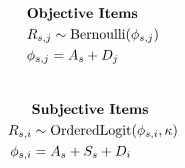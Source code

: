 \documentclass[12pt,preview,border=0]{standalone}
\begin{document}
$$
\begin{aligned} 
    & \text{\centering \textbf{Objective Items}} \\
    \hphantom{x} & R_{s,j}  \sim \text{Bernoulli}( \phi_{s,j} ) \\ 
	\hphantom{x} & \phi_{s,j}  = A_{s} + D_{j} 
\end{aligned}
$$
\\
$$
\begin{aligned}
    \hphantom{xxxx} & \text{\centering \textbf{Subjective Items}} \\
    R_{s,i}  & \sim \text{OrderedLogit}( \phi_{s,i}, \kappa ) \\ 
    \phi_{s,i} &  = A_{s} + S_s + D_{i}
\end{aligned}
$$
\end{document}
